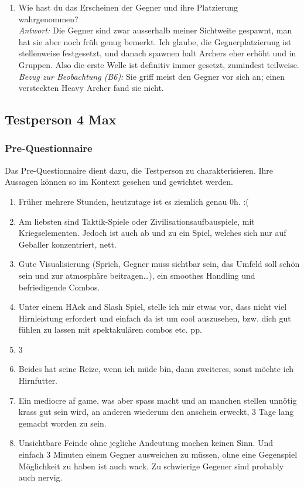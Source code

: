 \documentclass[../Main.tex]{subfiles}
\begin{document}
\begin{enumerate}[label=\textbf{I\arabic*}, leftmargin=1.5cm, itemsep=1em]
    \item Wie hast du das Erscheinen der Gegner und ihre Platzierung wahrgenommen? \\
    \textit{Antwort:} Die Gegner sind zwar ausserhalb meiner Sichtweite gespawnt, man hat sie aber noch früh genug bemerkt. Ich glaube, die Gegnerplatzierung ist stellenweise festgesetzt, und danach spawnen halt Archers eher erhöht und in Gruppen. Also die erste Welle ist definitiv immer gesetzt, zumindest teilweise. \\
    \textit{Bezug zur Beobachtung (B6):} Sie griff meist den Gegner vor sich an; einen versteckten Heavy Archer fand sie nicht.
\end{enumerate}

\subsection{Testperson 4 Max}
\subsubsection{Pre-Questionnaire}
 
Das Pre-Questionnaire dient dazu, die Testperson zu charakterisieren. Ihre Aussagen können so im Kontext gesehen und gewichtet werden.
 
\begin{enumerate}[label=\textbf{P\arabic*}, leftmargin=1.5cm, itemsep=0.5em]
    \item Früher mehrere Stunden, heutzutage ist es ziemlich genau 0h. :(
    \item Am liebsten sind Taktik-Spiele oder Zivilisationsaufbauspiele, mit Kriegselementen. Jedoch ist auch ab und zu ein Spiel, welches sich nur auf Geballer konzentriert, nett.
    \item Gute Visualisierung (Sprich, Gegner muss sichtbar sein, das Umfeld soll schön sein und zur atmosphäre beitragen…), ein smoothes Handling und befriedigende Combos.
    \item Unter einem HAck and Slash Spiel, stelle ich mir etwas vor, dass nicht viel Hirnleistung erfordert und einfach da ist um cool auszusehen, bzw. dich gut fühlen zu lassen mit spektakulären combos etc. pp.
    \item 3
    \item Beides hat seine Reize, wenn ich müde bin, dann zweiteres, sonst möchte ich Hirnfutter.
    \item Ein mediocre af game, was aber spass macht und an manchen stellen unnötig krass gut sein wird, an anderen wiederum den anschein erweckt, 3 Tage lang gemacht worden zu sein.
    \item Unsichtbare Feinde ohne jegliche Andeutung machen keinen Sinn. Und einfach 3 Minuten einem Gegner ausweichen zu müssen, ohne eine Gegenspiel Möglichkeit zu haben ist auch wack. Zu schwierige Gegener sind probably auch nervig.
\end{enumerate}
\end{document}
